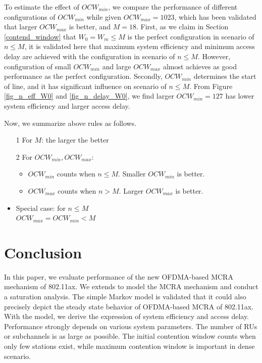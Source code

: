 \documentclass[journal]{IEEEtran}
\begin{document}
To estimate the effect of $OCW_{min}$, we compare the performance of different configurations of $OCW_{min}$ while given $OCW_{max}=1023$, which has been validated that larger $OCW_{max}$ is better, and $M=18$. 
First, as we claim in Section \ref{contend_window} that $W_0=W_m\leq M$ is the perfect configuration in scenario of $n\leq M$, it is validated here that maximum system efficiency and minimum access delay are achieved with the configuration in scenario of $n\leq M$.
However, configuration of small $OCW_{min}$ and large $OCW_{max}$ almost achieves as good performance as the perfect configuration.  
Secondly, $OCW_{min}$ determines the start of line, and it has significant influence on scenario of $n\leq M$.
From Figure \ref{fig_n_eff_W0} and \ref{fig_n_delay_W0}, we find larger $OCW_{min}=127$ has lower system efficiency and larger access delay. 

Now, we summarize above rules as follows.
 
\begin{itemize}
\item[1] For $M$: the larger the better
\item[2] For $OCW_{min}, OCW_{max}$:
	\begin{itemize}
	\item $OCW_{min}$ counts when $n\leq M$. Smaller $OCW_{min}$ is better.
	\item $OCW_{max}$ counts when $n>M$. Larger $OCW_{max}$ is better.
	\end{itemize}
\end{itemize}
\begin{itemize}
	\item Special case: for $n\leq M$\\
	$OCW_{max}=OCW_{min}<M$ 
\end{itemize}





\section{Conclusion}   \label{sec_conclu}
In this paper, we evaluate performance of the new OFDMA-based MCRA mechanism of 802.11ax.
We extends \cite{bianchi2000performance} to model the MCRA mechanism and conduct a saturation analysis.
The simple Markov model is validated that it could also precisely depict the steady state behavior of OFDMA-based MCRA of 802.11ax.
With the model, we derive the expression of system efficiency and access delay. 
Performance strongly depends on various system parameters.
The number of RUs or subchannels is as large as possible.
The initial contention window counts when only few stations exist, while maximum contention window is important in dense scenario.
\end{document}
